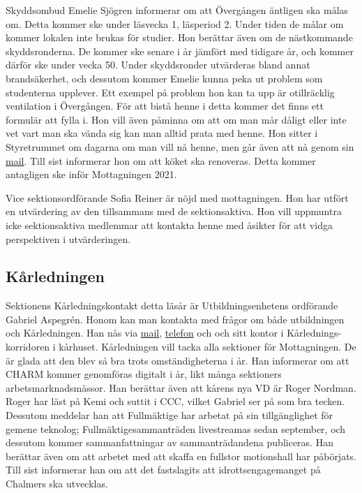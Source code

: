 \documentclass[hidelinks]{../sektionsmote} %
\begin{document}
Skyddsombud Emelie Sjögren informerar om att Övergången äntligen ska målas om.
Detta kommer ske under läsvecka 1, läsperiod 2.
Under tiden de målar om kommer lokalen inte brukas för studier.
Hon berättar även om de nästkommande skyddsronderna.
De kommer ske senare i år jämfört med tidigare år, och kommer därför ske under vecka 50. Under skyddsronder utvärderas bland annat brandsäkerhet, och dessutom kommer Emelie kunna peka ut problem som studenterna upplever.
Ett exempel på problem hon kan ta upp är otillräcklig ventilation i Övergången.
För att bistå henne i detta kommer det finns ett formulär att fylla i.
Hon vill även påminna om att om man mår dåligt eller inte vet vart man ska vända sig kan man alltid prata med henne.
Hon sitter i Styretrummet om dagarna om man vill nå henne, men går även att nå genom sin \href{mailto:styret.samo@ftek.se}{mail}.
Till sist informerar hon om att köket ska renoveras.
Detta kommer antagligen ske inför Mottagningen 2021.

Vice sektionsordförande Sofia Reiner är nöjd med mottagningen.
Hon har utfört en utvärdering av den tillsammans med de sektionsaktiva.
Hon vill uppmuntra icke sektionsaktiva medlemmar att kontakta henne med åsikter för att vidga perspektiven i utvärderingen.

\subsection{Kårledningen}
Sektionens Kårledningskontakt detta läsår är Utbildningsenhetens ordförande Gabriel Aspegrén.
Honom kan man kontakta med frågor om både utbildningen och Kårledningen.
Han nås via \href{mailto:uo@chalmersstudentkar.se}{mail}, \href{tel:+46317723912}{telefon} och och sitt kontor i Kårlednings-korridoren i kårhuset.
Kårledningen vill tacka alla sektioner för Mottagningen.
De är glada att den blev så bra trots omständigheterna i år.
Han informerar om att CHARM kommer genomföras digitalt i år, likt många sektioners arbetsmarknadsmässor.
Han berättar även att kårens nya VD är Roger Nordman.
Roger har läst på Kemi och suttit i CCC, vilket Gabriel ser på som bra tecken.
Dessutom meddelar han att Fullmäktige har arbetat på sin tillgänglighet för gemene teknolog; Fullmäktigesammanträden livestreamas sedan september, och dessutom kommer sammanfattningar av sammanträdandena publiceras.
Han berättar även om att arbetet med att skaffa en fullstor motionshall har påbörjats.
Till sist informerar han om att det fastslagits att idrottsengagemanget på Chalmers ska utvecklas.
\end{document}
